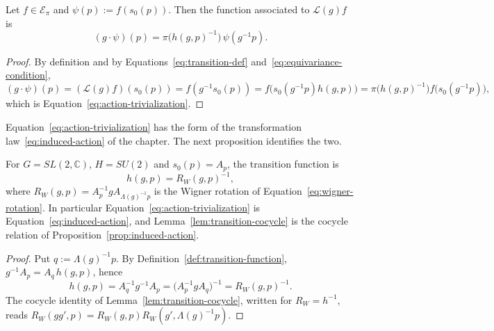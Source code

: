 	\begin{proposition}\label{prop:action-trivialization}
		Let $f\in\mathcal{E}_\pi$ and $\psi(p):=f(s_0(p))$. Then the function associated to $\mathcal{L}(g)f$ is
		\begin{equation}\label{eq:action-trivialization}
			(g\cdot\psi)(p)=\pi\big(h(g,p)^{-1}\big)\,\psi(g^{-1}p).
		\end{equation}
	\end{proposition}
	
	\begin{proof}
		By definition and by Equations~\eqref{eq:transition-def} and~\eqref{eq:equivariance-condition},
		\begin{equation*}
			(g\cdot\psi)(p)=(\mathcal{L}(g)f)(s_0(p))=f(g^{-1}s_0(p))=f\big(s_0(g^{-1}p)h(g,p)\big)=\pi\big(h(g,p)^{-1}\big)f\big(s_0(g^{-1}p)\big),
		\end{equation*}
		which is Equation~\eqref{eq:action-trivialization}.
	\end{proof}
	
	Equation~\eqref{eq:action-trivialization} has the form of the transformation law~\eqref{eq:induced-action} of the chapter. The next proposition identifies the two.
	
	\begin{proposition}\label{prop:wigner-transition}
		For $G=SL(2,\mathbb{C})$, $H=SU(2)$ and $s_0(p)=A_p$, the transition function is
		\begin{equation}\label{eq:wigner-transition}
			h(g,p)=R_W(g,p)^{-1},
		\end{equation}
		where $R_W(g,p)=A_p^{-1}gA_{\Lambda(g)^{-1}p}$ is the Wigner rotation of Equation~\eqref{eq:wigner-rotation}. In particular Equation~\eqref{eq:action-trivialization} is Equation~\eqref{eq:induced-action}, and Lemma~\ref{lem:transition-cocycle} is the cocycle relation of Proposition~\ref{prop:induced-action}.
	\end{proposition}
	
	\begin{proof}
		Put $q:=\Lambda(g)^{-1}p$. By Definition~\ref{def:transition-function}, $g^{-1}A_p=A_q\,h(g,p)$, hence
		\begin{equation*}
			h(g,p)=A_q^{-1}g^{-1}A_p=\big(A_p^{-1}gA_q\big)^{-1}=R_W(g,p)^{-1}.
		\end{equation*}
		The cocycle identity of Lemma~\ref{lem:transition-cocycle}, written for $R_W=h^{-1}$, reads $R_W(gg',p)=R_W(g,p)R_W(g',\Lambda(g)^{-1}p)$.
	\end{proof}
	
